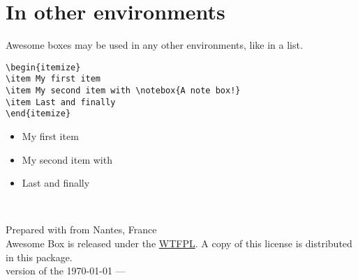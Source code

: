 \documentclass[a4paper,12pt]{article}
\def\abIconHeart{\symbol{"F004}}
\newcommand{\colophon}{
  ~\vfill
  \begin{center}
    \scriptsize Prepared with {\ABFamily\abIconHeart} from Nantes,
    France\\
    Awesome Box is released under the
    \hrefcolor{http://www.wtfpl.net/txt/copying/}{WTFPL}. A copy of this
    license is distributed in this package.\\
    \tiny version of the \today{} --- \currenttime
  \end{center}
}
\newcommand\hrefcolor[2]{\textcolor{magenta}{\href{#1}{#2}}}
\begin{document}
\section{In other environments}

Awesome boxes may be used in any other environments, like in a list.

\begin{verbatim}
\begin{itemize}
\item My first item
\item My second item with \notebox{A note box!}
\item Last and finally
\end{itemize}
\end{verbatim}

\begin{itemize}
\item My first item
\item My second item with 
\item Last and finally
\end{itemize}

\colophon
\end{document}
